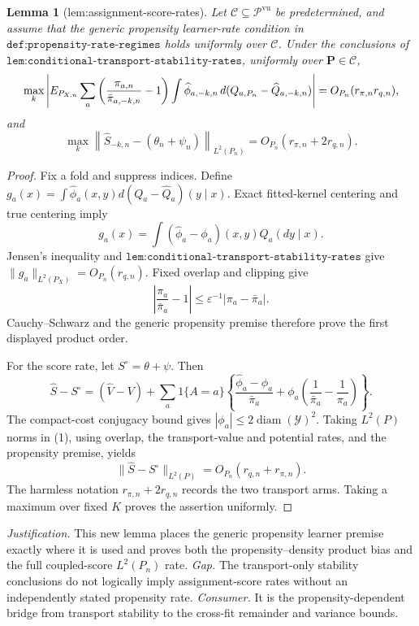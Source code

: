 \documentclass{article}
\newtheorem{lemma}{Lemma}
\begin{document}
\begin{lemma}[lem:assignment-score-rates]\label{lem:assignment-score-rates}
Let \(\mathscr C\subseteq\mathscr P^{\mathrm{vu}}\) be predetermined, and assume that the generic propensity learner-rate condition in \(\texttt{def:propensity-rate-regimes}\) holds uniformly over \(\mathscr C\).  Under the conclusions of \(\texttt{lem:conditional-transport-stability-rates}\), uniformly over \(\mathbf P\in\mathscr C\),
\[
\makebox[\linewidth][c]{\resizebox{0.98\linewidth}{!}{\par\noindent \makebox[\linewidth][c]{\resizebox{0.98\linewidth}{!}{\(\displaystyle \displaystyle \max_k\left|E_{P_{X,n}}\sum_a\left(\frac{\pi_{a,n}}{\bar\pi_{a,-k,n}}-1\right)\int\widehat\phi_{a,-k,n}\,d(Q_{a,P_n}-\widehat Q_{a,-k,n})\right|=O_{P_n}(r_{\pi,n}r_{q,n}),\)}}\par\noindent}}
\]
and
\[
\max_k\left\|\widehat S_{-k,n}-(\theta_n+\psi_n)\right\|_{L^2(P_n)}=O_{P_n}(r_{\pi,n}+2r_{q,n}).
\]
\end{lemma}
\begin{proof}
Fix a fold and suppress indices. Define \(g_a(x)=\int\widehat\phi_a(x,y)d(Q_a-\widehat Q_a)(y\mid x)\). Exact fitted-kernel centering and true centering imply
\[g_a(x)=\int(\widehat\phi_a-\phi_a)(x,y)Q_a(dy\mid x).\]
Jensen's inequality and \(\texttt{lem:conditional-transport-stability-rates}\) give \(\lVert g_a\rVert_{L^2(P_X)}=O_{P_n}(r_{q,n})\). Fixed overlap and clipping give
\[\left|\frac{\pi_a}{\bar\pi_a}-1\right|\le\varepsilon^{-1}|\pi_a-\bar\pi_a|.\]
Cauchy--Schwarz and the generic propensity premise therefore prove the first displayed product order.

For the score rate, let \(S^\circ=\theta+\psi\). Then
\[\widehat S-S^\circ=(\widehat V-V)+\sum_a1\{A=a\}\left\{\frac{\widehat\phi_a-\phi_a}{\bar\pi_a}+\phi_a\left(\frac1{\bar\pi_a}-\frac1{\pi_a}\right)\right\}.\tag{1}\]
The compact-cost conjugacy bound gives \(|\phi_a|\le2\operatorname{diam}(\mathcal Y)^2\). Taking \(L^2(P)\) norms in (1), using overlap, the transport-value and potential rates, and the propensity premise, yields
\[\lVert\widehat S-S^\circ\rVert_{L^2(P)}=O_{P_n}(r_{q,n}+r_{\pi,n}).\]
The harmless notation \(r_{\pi,n}+2r_{q,n}\) records the two transport arms. Taking a maximum over fixed \(K\) proves the assertion uniformly.
\end{proof}
\par\smallskip\noindent \textit{Justification.} This new lemma places the generic propensity learner premise exactly where it is used and proves both the propensity--density product bias and the full coupled-score \(L^2(P_n)\) rate. \textit{Gap.} The transport-only stability conclusions do not logically imply assignment-score rates without an independently stated propensity rate. \textit{Consumer.} It is the propensity-dependent bridge from transport stability to the cross-fit remainder and variance bounds.
\end{document}
